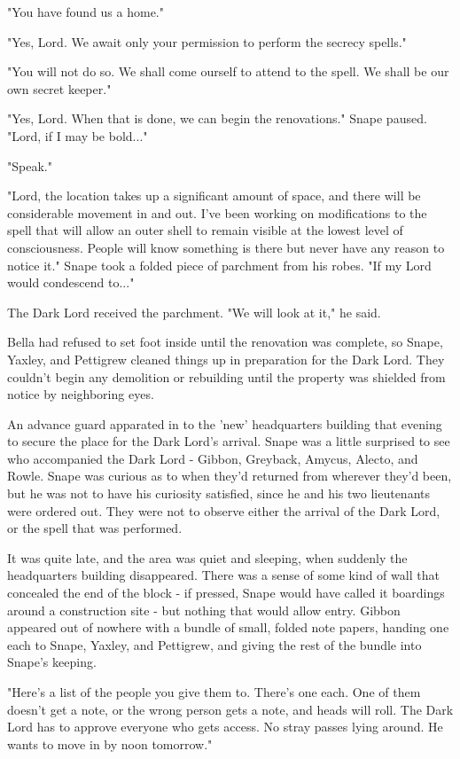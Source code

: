 \documentclass[a4paper,11pt]{article}
\begin{document}
"You have found us a home."

"Yes, Lord. We await only your permission to perform the secrecy spells."

"You will not do so. We shall come ourself to attend to the spell. We shall be our own secret keeper."

"Yes, Lord. When that is done, we can begin the renovations." Snape paused. "Lord, if I may be bold..."

"Speak."

"Lord, the location takes up a significant amount of space, and there will be considerable movement in and out. I've been working on modifications to the spell that will allow an outer shell to remain visible at the lowest level of consciousness. People will know something is there but never have any reason to notice it." Snape took a folded piece of parchment from his robes. "If my Lord would condescend to..."

The Dark Lord received the parchment. "We will look at it," he said.

Bella had refused to set foot inside until the renovation was complete, so Snape, Yaxley, and Pettigrew cleaned things up in preparation for the Dark Lord. They couldn't begin any demolition or rebuilding until the property was shielded from notice by neighboring eyes.

An advance guard apparated in to the 'new' headquarters building that evening to secure the place for the Dark Lord's arrival. Snape was a little surprised to see who accompanied the Dark Lord - Gibbon, Greyback, Amycus, Alecto, and Rowle. Snape was curious as to when they'd returned from wherever they'd been, but he was not to have his curiosity satisfied, since he and his two lieutenants were ordered out. They were not to observe either the arrival of the Dark Lord, or the spell that was performed.

It was quite late, and the area was quiet and sleeping, when suddenly the headquarters building disappeared. There was a sense of some kind of wall that concealed the end of the block - if pressed, Snape would have called it boardings around a construction site - but nothing that would allow entry. Gibbon appeared out of nowhere with a bundle of small, folded note papers, handing one each to Snape, Yaxley, and Pettigrew, and giving the rest of the bundle into Snape's keeping.

"Here's a list of the people you give them to. There's one each. One of them doesn't get a note, or the wrong person gets a note, and heads will roll. The Dark Lord has to approve everyone who gets access. No stray passes lying around. He wants to move in by noon tomorrow."
\end{document}
